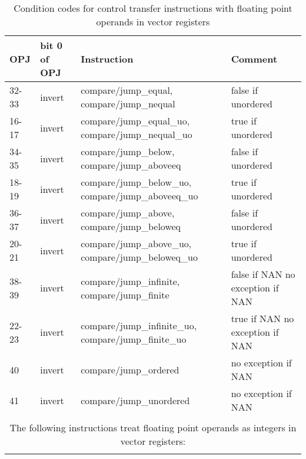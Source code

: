 \documentclass[forwardcom.tex]{subfiles}
\begin{document}
\begin{longtable}
{|p{10mm}|p{14mm}|p{55mm}|p{50mm}|}
\caption{Condition codes for control transfer instructions with floating point operands in vector registers }
\label{table:controlTransferInstructionsFloat}
\endfirsthead
\endhead
\hline
OPJ & bit 0 \newline of OPJ & Instruction & Comment \\
\hline
32-33 & invert & compare/jump\_equal, \newline compare/jump\_nequal & false if unordered \\
\hline
16-17 & invert & compare/jump\_equal\_uo, \newline compare/jump\_nequal\_uo & true if unordered \\
\hline
34-35 & invert & compare/jump\_below, \newline compare/jump\_aboveeq & false if unordered \\
\hline
18-19 & invert & compare/jump\_below\_uo, \newline compare/jump\_aboveeq\_uo & true if unordered \\
\hline
36-37 & invert & compare/jump\_above, \newline compare/jump\_beloweq & false if unordered \\
\hline
20-21 & invert & compare/jump\_above\_uo, \newline compare/jump\_beloweq\_uo & true if unordered \\
\hline
38-39 & invert & compare/jump\_infinite, \newline compare/jump\_finite & false if NAN \newline no exception if NAN \\
\hline
22-23 & invert & compare/jump\_infinite\_uo, \newline compare/jump\_finite\_uo & true if NAN \newline no exception if NAN \\
\hline
40    & invert & compare/jump\_ordered & no exception if NAN \\
\hline
41    & invert & compare/jump\_unordered & no exception if NAN \\
\hline

\multicolumn{4}{|c|}{} \\
\multicolumn{4}{|c|}{ The following instructions treat floating point operands as integers in vector registers: } \\
\multicolumn{4}{|c|}{} \\
\hline


\end{longtable}
\end{document}

